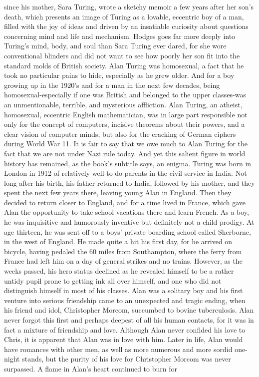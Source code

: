 since his mother, Sara Turing, wrote a sketchy memoir a few years after her son's
death, which presents an image of Turing as a lovable, eccentric boy of a man, filled
with the joy of ideas and driven by an insatiable curiosity about questions concerning
mind and life and mechanism. Hodges goes far more deeply into Turing's mind, body,
and soul than Sara Turing ever dared, for she wore conventional blinders and did not
want to see how poorly her son fit into the standard molds of British society. Alan
Turing was homosexual, a fact that he took no particular pains to hide, especially as
he grew older. And for a boy growing up in the 1920's and for a man in the next few
decades, being homosexual-especially if one was British and belonged to the upper
classes-was an unmentionable, terrible, and mysterious affliction.
        Alan Turing, an atheist, homosexual, eccentric English mathematician, was in
large part responsible not only for the concept of computers, incisive theorems about
their powers, and a clear vision of computer minds, but also for the cracking of
German ciphers during World War 11. It is fair to say that we owe much to Alan
Turing for the fact that we are not under Nazi rule today. And yet this salient figure in
world history has remained, as the book's subtitle says, an enigma.
        Turing was born in London in 1912 of relatively well-to-do parents in the civil
service in India. Not long after his birth, his father returned to India, followed by his
mother, and they spent the next few years there, leaving young Alan in England. Then
they decided to return closer to England, and for a time lived in France, which gave
Alan the opportunity to take school vacations there and learn French. As a boy, he
was inquisitive and humorously inventive but definitely not a child prodigy. At age
thirteen, he was sent off to a boys' private boarding school called Sherborne, in the
west of England. He made quite a hit his first day, for he arrived on bicycle, having
pedaled the 60 miles from Southampton, where the ferry from France had left him on
a day of general strikes and no trains. However, as the weeks passed, his hero status
declined as he revealed himself to be a rather untidy pupil prone to getting ink all over
himself, and one who did not distinguish himself in most of his classes. Alan was a
solitary boy and his first venture into serious friendship came to an unexpected and
tragic ending, when his friend and idol, Christopher Morcom, succumbed to bovine
tuberculosis.
        Alan never forgot this first and perhaps deepest of all his human contacts, for
it was in fact a mixture of friendship and love. Although Alan never confided his love
to Chris, it is apparent that Alan was in love with him. Later in life, Alan would have
romances with other men, as well as more numerous and more sordid one-night
stands, but the purity of his love for Christopher Morcom was never surpassed. A
flame in Alan's heart continued to burn for





